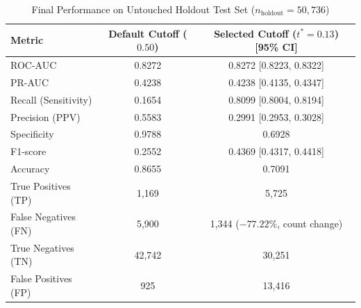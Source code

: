 \begin{table}[htbp]
\centering
\caption{Final Performance on Untouched Holdout Test Set ($n_{\text{holdout}} = 50,736$)}
\label{tab:holdout_performance}
\begin{tabular}{lcc}
\toprule
\textbf{Metric} & \textbf{Default Cutoff ($0.50$)} & \textbf{Selected Cutoff ($t^* = 0.13$) [95\% CI]} \\
\midrule
ROC-AUC & 0.8272 & 0.8272 [0.8223, 0.8322] \\
PR-AUC & 0.4238 & 0.4238 [0.4135, 0.4347] \\
Recall (Sensitivity) & 0.1654 & 0.8099 [0.8004, 0.8194] \\
Precision (PPV) & 0.5583 & 0.2991 [0.2953, 0.3028] \\
Specificity & 0.9788 & 0.6928 \\
F1-score & 0.2552 & 0.4369 [0.4317, 0.4418] \\
Accuracy & 0.8655 & 0.7091 \\
True Positives (TP) & 1,169 & 5,725 \\
False Negatives (FN) & 5,900 & 1,344 ($-77.22\%$, count change) \\
True Negatives (TN) & 42,742 & 30,251 \\
False Positives (FP) & 925 & 13,416 \\
\bottomrule
\end{tabular}
\end{table}
